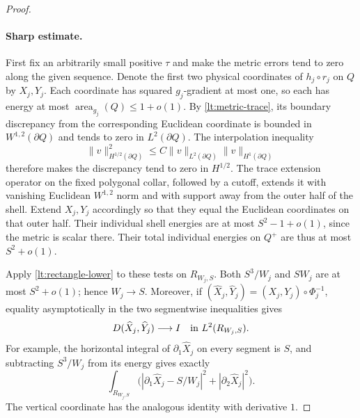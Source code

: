 \documentclass[11pt]{article}
\numberwithin{equation}{section}
\theoremstyle{definition}
\theoremstyle{remark}
\begin{document}
\begin{proof}
\paragraph{Sharp estimate.}
First fix an arbitrarily small positive
$\tau$ and make the metric errors tend to zero along the given
sequence.  Denote the first two physical coordinates of $h_j\circ r_j$
on $Q$ by $X_j,Y_j$.  Each coordinate has squared $g_j$-gradient at
most one, so each has energy at most
$\operatorname{area}_{g_j}(Q)\leq1+o(1)$.  By
\eqref{lt:metric-trace}, its boundary discrepancy from the corresponding
Euclidean coordinate is bounded in $W^{1,2}(\partial Q)$ and tends to
zero in $L^2(\partial Q)$.  The interpolation inequality
\[
 \|v\|_{H^{1/2}(\partial Q)}^2
      \leq C\|v\|_{L^2(\partial Q)}\|v\|_{H^1(\partial Q)}
\]
therefore makes the discrepancy tend to zero in $H^{1/2}$.
The trace extension operator on the fixed polygonal collar, followed
by a cutoff, extends it with vanishing Euclidean $W^{1,2}$ norm and
with support away from the outer half of the shell.  Extend $X_j,Y_j$
accordingly so that they equal the Euclidean coordinates on that outer
half.  Their individual shell energies are at most
$S^2-1+o(1)$, since the metric is scalar there.  Their total individual
energies on $Q^+$ are thus at most $S^2+o(1)$.

Apply \eqref{lt:rectangle-lower} to these tests on
$R_{W_j,S}$.  Both $S^3/W_j$ and $SW_j$ are at most $S^2+o(1)$;
hence $W_j\to S$.  Moreover, if
$(\widehat X_j,\widehat Y_j)=(X_j,Y_j)\circ\Phi_j^{-1}$, equality
asymptotically in the two segmentwise inequalities gives
\begin{equation}
 D(\widehat X_j,\widehat Y_j)\longrightarrow I
              \quad\hbox{in }L^2(R_{W_j,S}).
 \label{lt:coordinate-rigidity}
\end{equation}
For example, the horizontal integral of
$\partial_1\widehat X_j$ on every segment is $S$, and subtracting
$S^3/W_j$ from its energy gives exactly
\[
 \int_{R_{W_j,S}}
 \bigl(|\partial_1\widehat X_j-S/W_j|^2
               +|\partial_2\widehat X_j|^2\bigr).
\]
The vertical coordinate has the analogous identity with derivative
$1$.


\end{proof}
\end{document}
